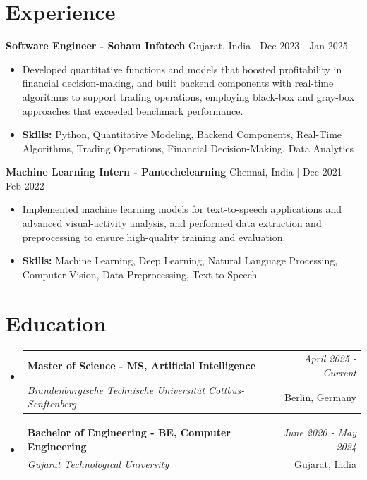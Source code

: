 \documentclass[a4paper,11pt]{article}
\makeatletter
\newcommand{\resumeSubheading}[4]{
\vspace{0.5mm}\item
    \begin{tabular*}{\linewidth}[t]{l@{\extracolsep{\fill}}r}
        \textbf{#1} & \textit{\footnotesize{#4}} \\
        \textit{\footnotesize{#3}} &  \footnotesize{#2}\\
    \end{tabular*}
    \vspace{-2.4mm}
}
\makeatother
\begin{document}
\section{\textbf{Experience}}


\vspace{1mm}
  \textbf{Software Engineer - Soham Infotech} \hfill Gujarat, India | Dec 2023 - Jan 2025
\vspace{-1.5mm} %
\begin{itemize}
  \item Developed quantitative functions and models that boosted profitability in financial decision-making, and built backend components with real-time algorithms to support trading operations, employing black-box and gray-box approaches that exceeded benchmark performance.

\vspace{-2mm}
  \item \textbf{Skills:} Python, Quantitative Modeling, Backend Components, Real-Time Algorithms, Trading Operations, Financial Decision-Making, Data Analytics
\end{itemize}

\vspace{1mm}
  \textbf{Machine Learning Intern - Pantechelearning} \hfill Chennai, India | Dec 2021 - Feb 2022
\vspace{-1.5mm} %
\begin{itemize}
  \item Implemented machine learning models for text-to-speech applications and advanced visual-activity analysis, and performed data extraction and preprocessing to ensure high-quality training and evaluation.
\vspace{-2mm}
  \item \textbf{Skills:} Machine Learning, Deep Learning, Natural Language Processing, Computer Vision, Data Preprocessing, Text-to-Speech
\end{itemize}\section{\textbf{Education}}
\vspace{-0.4mm}

\begin{itemize}[leftmargin=0.15in, label={}]
\resumeSubheading
{Master of Science - MS, Artificial Intelligence }{Berlin, Germany}
{Brandenburgische Technische Universität Cottbus-Senftenberg  }{April 2025 - Current}

\vspace{1.0mm} %
\resumeSubheading
{Bachelor of Engineering - BE, Computer Engineering  }{Gujarat, India}
{Gujarat Technological University }{June 2020 - May 2024}

\end{itemize}
\end{document}
